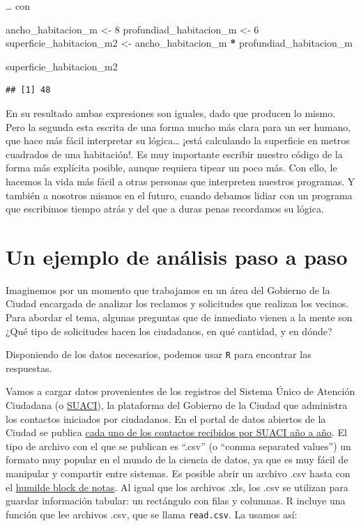 \documentclass[]{book}
\newenvironment{Shaded}{\begin{snugshade}}{\end{snugshade}}
\newcommand{\DecValTok}[1]{\textcolor[rgb]{0.00,0.00,0.81}{#1}}
\newcommand{\StringTok}[1]{\textcolor[rgb]{0.31,0.60,0.02}{#1}}
\newcommand{\OperatorTok}[1]{\textcolor[rgb]{0.81,0.36,0.00}{\textbf{#1}}}
\newcommand{\NormalTok}[1]{#1}
\begin{document}
\ldots{} con

\begin{Shaded}
\begin{Highlighting}[]
\NormalTok{ancho_habitacion_m <-}\StringTok{ }\DecValTok{8}
\NormalTok{profundiad_habitacion_m <-}\StringTok{ }\DecValTok{6}
\NormalTok{superficie_habitacion_m2 <-}\StringTok{ }\NormalTok{ancho_habitacion_m }\OperatorTok{*}\StringTok{ }\NormalTok{profundiad_habitacion_m}

\NormalTok{superficie_habitacion_m2}
\end{Highlighting}
\end{Shaded}

\begin{verbatim}
## [1] 48
\end{verbatim}

En su resultado ambas expresiones son iguales, dado que producen lo
mismo. Pero la segunda esta escrita de una forma mucho más clara para un
ser humano, que hace más fácil interpretar su lógica\ldots{} ¡está
calculando la superficie en metros cuadrados de una habitación!. Es muy
importante escribir nuestro código de la forma más explícita posible,
aunque requiera tipear un poco más. Con ello, le hacemos la vida más
fácil a otras personas que interpreten nuestros programas. Y también a
nosotros mismos en el futuro, cuando debamos lidiar con un programa que
escribimos tiempo atrás y del que a duras penas recordamos su lógica.

\section{Un ejemplo de análisis paso a
paso}\label{un-ejemplo-de-analisis-paso-a-paso}

Imaginemos por un momento que trabajamos en un área del Gobierno de la
Ciudad encargada de analizar los reclamos y solicitudes que realizan los
vecinos. Para abordar el tema, algunas preguntas que de inmediato vienen
a la mente son ¿Qué tipo de solicitudes hacen los ciudadanos, en qué
cantidad, y en dónde?

Disponiendo de los datos necesarios, podemos usar \texttt{R} para
encontrar las respuestas.

Vamos a cargar datos provenientes de los registros del Sistema Único de
Atención Ciudadana (o \href{https://suaci.buenosaires.gob.ar}{SUACI}),
la plataforma del Gobierno de la Ciudad que administra los contactos
iniciados por ciudadanos. En el portal de datos abiertos de la Ciudad se
publica
\href{https://data.buenosaires.gob.ar/dataset/sistema-unico-atencion-ciudadana}{cada
uno de los contactos recibidos por SUACI año a año}. El tipo de archivo
con el que se publican es ``.csv'' (o ``comma separated values'') un
formato muy popular en el mundo de la ciencia de datos, ya que es muy
fácil de manipular y compartir entre sistemas. Es posible abrir un
archivo .csv hasta con el
\href{https://es.wikipedia.org/wiki/Bloc_de_notas}{humilde block de
notas}. Al igual que los archivos .xls, los .csv se utilizan para
guardar información tabular: un rectángulo con filas y columnas. R
incluye una función que lee archivos .csv, que se llama
\texttt{read.csv}. La usamos así:
\end{document}

